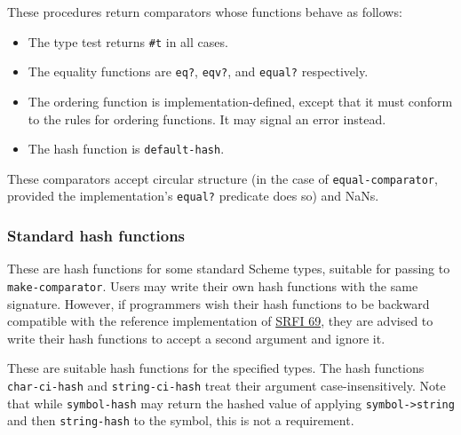 \begin{entry}{%
  }

  These procedures return comparators whose functions behave as
  follows:

  \begin{itemize}
  \item The type test returns \texttt{\#t} in all cases.
  \item The equality functions are \texttt{eq?}, \texttt{eqv?}, and
    \texttt{equal?} respectively.
  \item The ordering function is implementation-defined, except that
    it must conform to the rules for ordering functions. It may signal
    an error instead.
  \item The hash function is \texttt{default-hash}.
  \end{itemize}

  These comparators accept circular structure (in the case of
  \texttt{equal-comparator}, provided the implementation's
  \texttt{equal?}  predicate does so) and NaNs.
\end{entry}

\hypertarget{Hashfunctions}{\subsubsection{Standard hash
functions}}

These are hash functions for some standard Scheme types, suitable for
passing to \texttt{make-comparator}. Users may write their own hash
functions with the same signature. However, if programmers wish their
hash functions to be backward compatible with the reference
implementation of
\href{http://srfi.schemers.org/srfi-69/srfi-69.html}{SRFI 69}, they are
advised to write their hash functions to accept a second argument and
ignore it.

\begin{entry}{%
  }

  These are suitable hash functions for the specified types. The hash
  functions \texttt{char-ci-hash} and \texttt{string-ci-hash} treat
  their argument case-insensitively. Note that while
  \texttt{symbol-hash} may return the hashed value of applying
  \texttt{symbol->string} and then \texttt{string-hash} to the symbol,
  this is not a requirement.
\end{entry}

